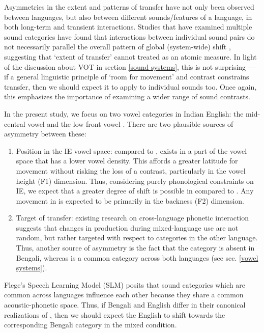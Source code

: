 \documentclass[12 pt]{article}
\newcommand{\nt}[1]{\textipa{[#1]}} %
\begin{document}
Asymmetries in the extent and patterns of transfer have not only been observed between languages, but also between different sounds/features of a language, in both long-term and transient interactions. Studies that have examined multiple sound categories have found that interactions between individual sound pairs do not necessarily parallel the overall pattern of global (system-wide) shift \citep[e.g.][vowel quality]{chang2012rapid,elias2017effects}, suggesting that `extent of transfer' cannot treated as an atomic measure. In light of the discussion about VOT in section \ref{sound systems}, this is not surprising --- if a general linguistic principle of `room for movement' and contrast constrains transfer, then we should expect it to apply to individual sounds too. Once again, this emphasizes the importance of examining a wider range of sound contrasts.


In the present study, we focus on two vowel categories in Indian English: the mid-central vowel \nt{2} and the low front vowel \nt{\ae}. There are two plausible sources of asymmetry between these:
\begin{enumerate}
	\item Position in the IE vowel space: compared to \nt{\ae}, \nt{2} exists in a part of the vowel space that has a lower vowel density. This affords a greater latitude for movement without risking the loss of a contrast, particularly in the vowel height (F1) dimension. Thus, considering purely phonological constraints on IE, we expect that a greater degree of shift is possible in \nt{2} compared to \nt{\ae}. Any movement in \nt{\ae} is expected to be primarily in the backness (F2) dimension.
	\item Target of transfer: existing research on cross-language phonetic interaction suggests that changes in production during mixed-language use are not random, but rather targeted with respect to categories in the other language. Thus, another source of asymmetry is the fact that the category \nt{2} is absent in Bengali, whereas \nt{\ae} is a common category across both languages (see sec. \ref{vowel systems}).
\end{enumerate}


Flege's Speech Learning Model (SLM) \citeyearpar{flege1995second,flege2007language} posits that sound categories which are common across languages influence each other because they share a common acoustic-phonetic space. Thus, if Bengali and English differ in their canonical realizations of \nt{\ae}, then we should expect the English \nt{\ae} to shift towards the corresponding Bengali category in the mixed condition. 
\end{document}
